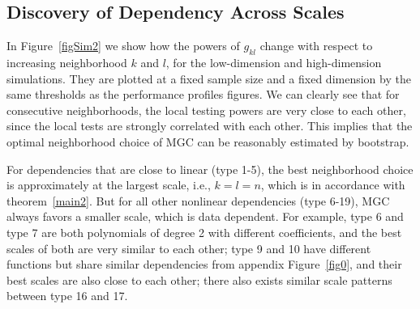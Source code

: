 \documentclass[11pt]{article}
\newcommand{\jv}[1]{{\color{red}{#1}}}
\newcommand{\cs}[1]{{\color{blue}{#1}}}
\begin{document}
\subsection{Discovery of Dependency Across Scales}


In Figure~\ref{figSim2} we show how the powers of $g_{kl}$ change with respect to increasing neighborhood $k$ and $l$, for the low-dimension and high-dimension simulations. They are plotted at a fixed sample size and a fixed dimension by the same thresholds as the performance profiles figures. We can clearly see that for consecutive neighborhoods, the local testing powers are very close to each other, since the local tests are strongly correlated with each other. This implies that the optimal neighborhood choice of MGC can be reasonably estimated by bootstrap.

For dependencies that are close to linear (type 1-5), the best neighborhood choice is approximately at the largest scale, i.e., $k=l=n$, which is in accordance with theorem~\ref{main2}. But for all other nonlinear dependencies (type 6-19), MGC always favors a smaller scale, which is data dependent. For example, type 6 and type 7 are both polynomials of degree 2 with different coefficients, and the best scales of both are very similar to each other; type 9 and 10 have different functions but share similar dependencies from appendix Figure~\ref{fig0}, and their best scales are also close to each other; there also exists similar scale patterns between type 16 and 17.

\jv{the point of this section is to convey to the reader that we can assess which scales contain dependencies, unlike others, and justify the results as having some intuition, eg, for the circle and spiral, or the nearly linear ones.  in fact, maybe theorem 2 goes in here?}
\cs{ok; and based on your description I have added a few sentences; feel free to change/discard them. }
\end{document}
